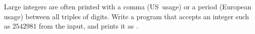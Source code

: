 \begin{exercise}
  \label{ex:mille-comma}
  Large integers are often printed with a comma (US~usage) or a period
  (European usage) between all triples of digits. Write a program that
  accepts an integer such as $2542981$ from the input, and prints it as
  .
\end{exercise}

\endinput

The web site
\url{http://www.codeforwin.in/2015/06/for-do-while-loop-programming-exercises.html}

\begin{comment}
  \begin{multicols}{2}
    \begin{lstlisting}
    \end{lstlisting}
    \columnbreak
    \begin{lstlisting}
    \end{lstlisting}
  \end{multicols}
  \begin{multicols}{2}
    \begin{lstlisting}
    \end{lstlisting}
    \columnbreak
    \begin{lstlisting}
    \end{lstlisting}
  \end{multicols}
\end{comment}
